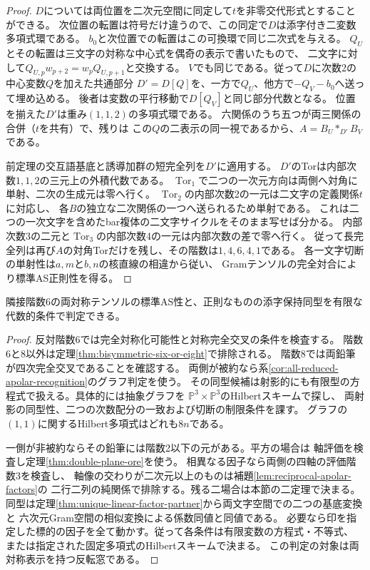 \begin{proof}
$D$については両位置を二次元空間に同定して$t$を非零交代形式とすることができる。
次位置の転置は符号だけ違うので、この同定で$D$は添字付き二変数多項式環である。
$b_0$と次位置での転置はこの可換環で同じ二次式を与える。
$Q_U$とその転置は三文字の対称な中心式を偶奇の表示で書いたもので、
二文字に対して$Q_{U,p}w_{p+2}=w_p Q_{U,p+1}$と交換する。
$V$でも同じである。従って$D$に次数2の中心変数$Q$を加えた共通部分
$D'=D[Q]$を、一方で$Q_U$、他方で$-Q_V-b_0$へ送って埋め込める。
後者は変数の平行移動で$D[Q_V]$と同じ部分代数となる。
位置を揃えた$D'$は重み$(1,1,2)$の多項式環である。
六関係のうち五つが両三関係の合併（$t$を共有）で、残りは
この$Q$の二表示の同一視であるから、$A=B_U*_{D'}B_V$である。

前定理の交互語基底と誘導加群の短完全列を$D'$に適用する。
$D'$のTorは内部次数$1,1,2$の三元上の外積代数である。
$\operatorname{Tor}_1$で二つの一次元方向は両側へ対角に単射、二次の生成元は零へ行く。
$\operatorname{Tor}_2$の内部次数2の一元は二文字の定義関係$t$に対応し、
各$B$の独立な二次関係の一つへ送られるため単射である。
これは二つの一次文字を含めたbar複体の二文字サイクルをそのまま写せば分かる。
内部次数3の二元と$\operatorname{Tor}_3$の内部次数4の一元は内部次数の差で零へ行く。
従って長完全列は再び$A$の対角Torだけを残し、その階数は$1,4,6,4,1$である。
各一文字切断の単射性は$a,m$と$b,n$の核直線の相違から従い、
Gramテンソルの完全対合により標準AS正則性を得る。
\end{proof}

\begin{corollary}[両対称反転窓の有限な分類手順]\label{cor:bisymmetric-effective-recognition}
隣接階数6の両対称テンソルの標準AS性と、正則なものの添字保持同型を有限な代数的条件で判定できる。
\end{corollary}
\begin{proof}
反対階数6では完全対称化可能性と対称完全交叉の条件を検査する。
階数6と8以外は定理\ref{thm:bisymmetric-six-or-eight}で排除される。
階数8では両鉛筆が四次完全交叉であることを確認する。
両側が被約なら系\ref{cor:all-reduced-apolar-recognition}のグラフ判定を使う。
その同型候補は射影的にも有限型の方程式で扱える。具体的には抽象グラフを
$\mathbb P^3\times\mathbb P^3$のHilbertスキームで探し、
両射影の同型性、二つの次数配分の一致および切断の制限条件を課す。
グラフの$(1,1)$に関するHilbert多項式はどれも$8n$である。

一側が非被約ならその鉛筆には階数2以下の元がある。平方の場合は
軸評価を検査し定理\ref{thm:double-plane-ore}を使う。
相異なる因子なら両側の四軸の評価階数3を検査し、
軸像の交わりが二次元以上のものは補題\ref{lem:reciprocal-apolar-factors}の
二行二列の純関係で排除する。残る二場合は本節の二定理で決まる。
同型は定理\ref{thm:unique-linear-factor-partner}から両文字空間での二つの基底変換と
六次元Gram空間の相似変換による係数同値と同値である。
必要なら印を指定した標的の因子を全て動かす。従って各条件は有限変数の方程式・不等式、
または指定された固定多項式のHilbertスキームで決まる。
この判定の対象は両対称表示を持つ反転窓である。
\end{proof}
